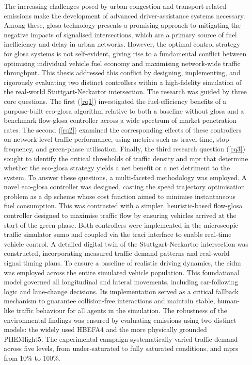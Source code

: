 The increasing challenges posed by urban congestion and transport-related emissions make the development of advanced driver-assistance systems necessary. Among these, \ac{glosa} technology presents a promising approach to mitigating the negative impacts of signalised intersections, which are a primary source of fuel inefficiency and delay in urban networks. However, the optimal control strategy for \ac{glosa} systems is not self-evident, giving rise to a fundamental conflict between optimising individual vehicle fuel economy and maximising network-wide traffic throughput. This thesis addressed this conflict by designing, implementing, and rigorously evaluating two distinct controllers within a high-fidelity simulation of the real-world Stuttgart-Neckartor intersection.
\mynewline
The research was guided by three core questions. The first (\vref{rq1}) investigated the fuel-efficiency benefits of a purpose-built \ac{eco-glosa} algorithm relative to both a baseline without \ac{glosa} and a benchmark \ac{flow-glosa} controller across a wide spectrum of market penetration rates. The second (\vref{rq2}) examined the corresponding effects of these controllers on network-level traffic performance, using metrics such as travel time, stop frequency, and green-phase utilisation. Finally, the third research question (\vref{rq3}) sought to identify the critical thresholds of traffic density and \ac{mpr} that determine whether the \ac{eco-glosa} strategy yields a net benefit or a net detriment to the system.
\mynewline
To answer these questions, a multi-faceted methodology was employed. A novel \ac{eco-glosa} controller was designed, casting the speed trajectory optimisation problem as a \ac{dp} scheme whose cost function aimed to minimise instantaneous fuel consumption. This was contrasted with a simpler, heuristic-based \ac{flow-glosa} controller designed to maximise traffic flow by ensuring vehicles arrived at the start of the green phase. Both controllers were implemented in the microscopic traffic simulator \ac{sumo} and coupled via the \ac{traci} interface to enable real-time vehicle control. A detailed digital twin of the Stuttgart-Neckartor intersection was constructed, incorporating measured traffic demand patterns and real-world signal timing plans. To ensure a baseline of realistic driving dynamics, the \ac{eidm} was employed across the entire simulated vehicle population. This foundational model governed all longitudinal and lateral movements, including car-following logic and lane-change decisions. Its implementation served as a critical fallback mechanism to guarantee collision-free interactions and maintain stable, human-like traffic behaviour for all agents in the simulation. The robustness of the environmental findings was ensured by evaluating emissions using two distinct models: the widely used HBEFA4 and the more physically grounded PHEMlight5. The experimental campaign systematically varied traffic demand across five levels, from under-saturated to fully saturated conditions, and \acp{mpr} from $10\%$ to $100\%$.
